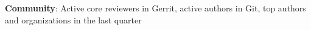 \textbf{Community}: Active core reviewers in Gerrit, active authors in Git, top authors and organizations in the last quarter
